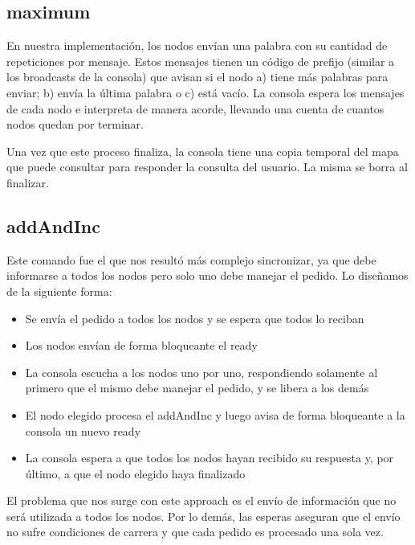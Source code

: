 \subsection{maximum}

En nuestra implementación, los nodos envían una palabra con su cantidad de repeticiones por mensaje. Estos mensajes tienen un código de prefijo (similar a los broadcasts de la consola) que avisan si el nodo a) tiene más palabras para enviar; b) envía la última palabra o c) está vacío. La consola espera los mensajes de cada nodo e interpreta de manera acorde, llevando una cuenta de cuantos nodos quedan por terminar.

Una vez que este proceso finaliza, la consola tiene una copia temporal del mapa que puede consultar para responder la consulta del usuario. La misma se borra al finalizar.

\subsection{addAndInc}

Este comando fue el que nos resultó más complejo sincronizar, ya que debe informarse a todos los nodos pero solo uno debe manejar el pedido. Lo diseñamos de la siguiente forma:

\begin{itemize}
	\item Se envía el pedido a todos los nodos y se espera que todos lo reciban

	\item Los nodos envían de forma bloqueante el ready

	\item La consola escucha a los nodos uno por uno, respondiendo solamente al primero que el mismo debe manejar el pedido, y se libera a los demás

	\item El nodo elegido procesa el addAndInc y luego avisa de forma bloqueante a la consola un nuevo ready

	\item La consola espera a que todos los nodos hayan recibido su respuesta y, por último, a que el nodo elegido haya finalizado
\end{itemize}

El problema que nos surge con este approach es el envío de información que no será utilizada a todos los nodos. Por lo demás, las esperas aseguran que el envío no sufre condiciones de carrera y que cada pedido es procesado una sola vez.